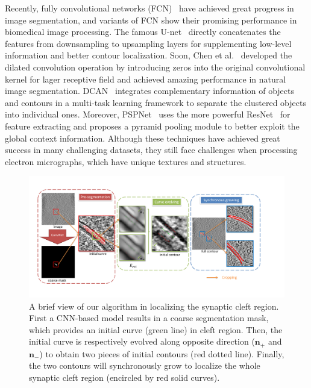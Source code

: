 Recently, fully convolutional networks (FCN)~\cite{Long2015,Ronneberger2015,Chen2016a,Chen2017,Zhao2016} have achieved great progress in image segmentation, and variants of FCN \cite{Ronneberger2015,Chen2017,Dhungel2015,Lieman-Sifry2017,Chen2016b,Ourselin} show their promising performance in biomedical image processing.
%
The famous U-net~\cite{Ronneberger2015} directly concatenates the features from downsampling to upsampling layers for supplementing low-level information and better contour localization.
Soon, Chen et al.~\cite{Chen2016a} developed the dilated convolution operation by introducing zeros into the original convolutional kernel for lager receptive field and achieved amazing performance in natural image segmentation.
DCAN~\cite{Chen2017} integrates complementary information of objects and contours in a multi-task learning framework to separate the clustered objects into individual ones.
Moreover, PSPNet~\cite{Zhao2016} uses the more powerful ResNet~\cite{He2016} for feature extracting and proposes a pyramid pooling module to better exploit the global context information.
%
Although these techniques have achieved great success in many challenging datasets, they still face challenges when processing electron micrographs, which have unique textures and structures.


\begin{figure}[t]
    \begin{center}
        \includegraphics[width=7in]{figs/FigCG.pdf}
   \end{center}
\caption{A brief view of our algorithm in localizing the synaptic cleft region. First a CNN-based model results in a coarse segmentation mask, which provides an initial curve (green line) in cleft region.
        Then, the initial curve is respectively evolved along opposite direction ($\mathbf{n}_+$ and $\mathbf{n}_-$) to obtain two pieces of initial contours (red dotted line).
        Finally, the two contours will synchronously grow to localize the whole synaptic cleft region (encircled by red solid curves).}
\label{fig:cg}
\end{figure}


